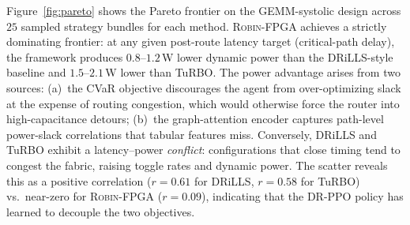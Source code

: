 \documentclass[journal,onecolumn=false]{IEEEtran}
\begin{document}
Figure~\ref{fig:pareto} shows the Pareto frontier on the GEMM-systolic design across $25$ sampled strategy bundles for each method. \textsc{Robin-FPGA} achieves a strictly dominating frontier: at any given post-route latency target (critical-path delay), the framework produces $0.8$--$1.2$\,W lower dynamic power than the DRiLLS-style baseline and $1.5$--$2.1$\,W lower than TuRBO. The power advantage arises from two sources: (a)~the CVaR objective discourages the agent from over-optimizing slack at the expense of routing congestion, which would otherwise force the router into high-capacitance detours; (b)~the graph-attention encoder captures path-level power-slack correlations that tabular features miss. Conversely, DRiLLS and TuRBO exhibit a latency--power \emph{conflict}: configurations that close timing tend to congest the fabric, raising toggle rates and dynamic power. The scatter reveals this as a positive correlation ($r=0.61$ for DRiLLS, $r=0.58$ for TuRBO) vs.\ near-zero for \textsc{Robin-FPGA} ($r=0.09$), indicating that the DR-PPO policy has learned to decouple the two objectives.
\end{document}
